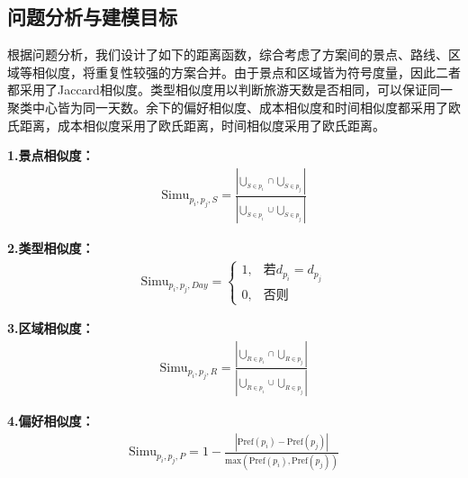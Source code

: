 \subsection[\hspace{-2pt}问题分析与建模目标]{{\heiti{} \hspace{-8pt}问题分析与建模目标}}\label{section2: 问题分析与建模目标}

根据问题分析，我们设计了如下的距离函数，综合考虑了方案间的景点、路线、区域等相似度，将重复性较强的方案合并。由于景点和区域皆为符号度量，因此二者都采用了Jaccard相似度。类型相似度用以判断旅游天数是否相同，可以保证同一聚类中心皆为同一天数。余下的偏好相似度、成本相似度和时间相似度都采用了欧氏距离，成本相似度采用了欧氏距离，时间相似度采用了欧氏距离。

\noindent\textbf{1.景点相似度：}
\begin{equation}
  \begin{aligned}
    \text{Simu}_{p_{i},p_{j},S} = \frac{|\underset{S\in p_i}{\bigcup}\cap \underset{S\in p_j}{\bigcup}|}{|\underset{S\in p_i}{\bigcup}\cup \underset{S\in p_j}{\bigcup}|}
  \end{aligned}
\end{equation}

\noindent\textbf{2.类型相似度：}
\begin{equation}
  \begin{aligned}
    \text{Simu}_{p_{i},p_{j},Day} = \begin{cases}
      1, & \text{若}d_{p_i}=d_{p_j}\\
      0, & \text{否则}
    \end{cases}
  \end{aligned}
\end{equation}

\noindent\textbf{3.区域相似度：}
\begin{equation}
  \begin{aligned}
    \text{Simu}_{p_{i},p_{j},R} = \frac{|\underset{R\in p_i}{\bigcup}\cap \underset{R\in p_j}{\bigcup}|}{|\underset{R\in p_i}{\bigcup}\cup \underset{R\in p_j}{\bigcup}|}
  \end{aligned}
\end{equation}

\noindent\textbf{4.偏好相似度：}
\begin{equation}
  \begin{aligned}
    \text{Simu}_{p_{i},p_{j},P} = 1-\frac{|\text{Pref}(p_{i})-\text{Pref}(p_{j})|}{\text{max}(\text{Pref}(p_{i}),\text{Pref}(p_{j}))}
  \end{aligned}
\end{equation}

